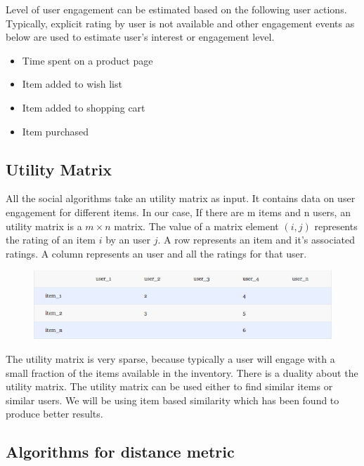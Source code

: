 \documentclass[12pt]{article} %
\begin{document}
Level of user engagement can be estimated based on the following user actions. Typically, explicit rating by user is not available and other engagement events as below are used to estimate user's interest or engagement level.

\begin{itemize}
\item Time spent on a product page
\item Item added to wish list
\item Item added to shopping cart
\item Item purchased
\end{itemize}

\subsection{Utility Matrix}

All the social algorithms take an utility matrix as input. It contains data on user engagement for different items. In our case, If there are m items and n users, an utility matrix is a $m \times n$ matrix. The value of a matrix element $(i, j)$ represents the rating of an item $i$ by an user $j$. A row represents an item and it's associated ratings. A column represents an user and all the ratings for that user.

\begin{figure}[h]
\begin{center}
\includegraphics[width=5in]{user.png}
\end{center}
\end{figure}

The utility matrix is very sparse, because  typically a user will engage with a small fraction of the items available in the inventory. There is a duality about the utility matrix. The utility matrix can be used either to find similar items or similar users. We will be using item based similarity which has been found to produce better results.

\subsection{Algorithms for distance metric}
\end{document}
